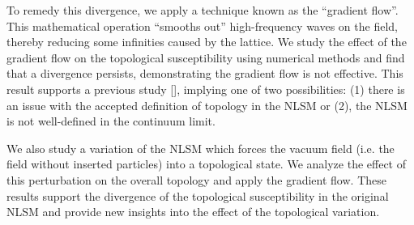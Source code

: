 \documentclass[english,11pt]{article}
\renewcommand{\cite}[1]{[\footfullcite{#1}]}
\begin{document}
To remedy this divergence, we apply a technique known as the ``gradient flow''. This mathematical operation ``smooths out'' high-frequency waves on the field, thereby reducing some infinities caused by the lattice. We study the effect of the gradient flow on the topological susceptibility using numerical methods and find that a divergence persists, demonstrating the gradient flow is not effective. This result supports a previous study \cite{bietenholz2018}, implying one of two possibilities: (1) there is an issue with the accepted definition of topology in the NLSM or (2), the NLSM is not well-defined in the continuum limit.

We also study a variation of the NLSM which forces the vacuum field (i.e. the field without inserted particles) into a topological state. We analyze the effect of this perturbation on the overall topology and apply the gradient flow. These results support the divergence of the topological susceptibility in the original NLSM and provide new insights into the effect of the topological variation.
\end{document}
